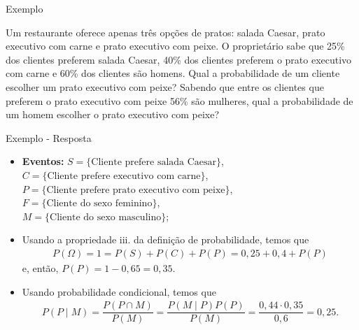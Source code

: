 \documentclass[9pt]{beamer}
\begin{document}
\begin{frame}{Exemplo}


Um restaurante oferece apenas três opções de pratos: salada Caesar,
prato executivo com carne e prato executivo com peixe. O proprietário sabe que 25\% dos clientes preferem salada Caesar, 40\% dos clientes preferem o prato executivo com carne e 60\% dos 
clientes são homens. Qual a probabilidade de um cliente escolher um prato executivo com peixe? Sabendo que entre os clientes que preferem o prato executivo com peixe 56\% são mulheres, 
qual a probabilidade de um homem escolher o prato executivo com peixe?

\end{frame}

\begin{frame}{Exemplo - Resposta}
\begin{itemize}
	\item \textbf{Eventos:} $S = \{\mbox{Cliente prefere salada Caesar}\}$, $C = \{\mbox{Cliente prefere executivo com carne}\}$, $P=\{\mbox{Cliente prefere prato executivo com peixe}\}$, \\
	$F = \{\mbox{Cliente do sexo feminino}\}$,\\
	$M=\{\mbox{Cliente do sexo masculino}\}$;
	\vfill 
	
	\item Usando a propriedade iii. da definição de probabilidade, temos que
	\begin{align*}
	P(\Omega)= 1 = P(S) + P(C) + P(P) = 0,25 + 0,4 + P(P)
	\end{align*}
	e, então, $P(P) = 1 - 0,65 = 0,35$.
	\vfill
	
	\item Usando probabilidade condicional, temos que
	\begin{align*}
	P(P \mid M) = \dfrac{P(P \cap M)}{P(M)} = \dfrac{P(M \mid P)P(P)}{P(M)} = \dfrac{0,44 \cdot 0,35}{0,6} = 0,25.
	\end{align*}
\end{itemize}
\end{frame}

\end{document}

